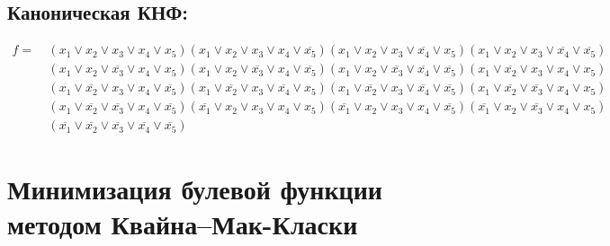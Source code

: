 \documentclass{article}
\begin{document}
\subsection*{Каноническая КНФ:}
\begin{align*}
f =\: &\left(x_{1} \lor x_{2} \lor x_{3} \lor x_{4} \lor x_{5}\right)\left(x_{1} \lor x_{2} \lor x_{3} \lor x_{4} \lor \overline{x_{5}}\right)\left(x_{1} \lor x_{2} \lor x_{3} \lor \overline{x_{4}} \lor x_{5}\right)\left(x_{1} \lor x_{2} \lor x_{3} \lor \overline{x_{4}} \lor \overline{x_{5}}\right)\\&\left(x_{1} \lor x_{2} \lor \overline{x_{3}} \lor x_{4} \lor x_{5}\right)\left(x_{1} \lor x_{2} \lor \overline{x_{3}} \lor x_{4} \lor \overline{x_{5}}\right)\left(x_{1} \lor x_{2} \lor \overline{x_{3}} \lor \overline{x_{4}} \lor \overline{x_{5}}\right)\left(x_{1} \lor \overline{x_{2}} \lor x_{3} \lor x_{4} \lor x_{5}\right)\\&\left(x_{1} \lor \overline{x_{2}} \lor x_{3} \lor x_{4} \lor \overline{x_{5}}\right)\left(x_{1} \lor \overline{x_{2}} \lor x_{3} \lor \overline{x_{4}} \lor x_{5}\right)\left(x_{1} \lor \overline{x_{2}} \lor x_{3} \lor \overline{x_{4}} \lor \overline{x_{5}}\right)\left(x_{1} \lor \overline{x_{2}} \lor \overline{x_{3}} \lor x_{4} \lor x_{5}\right)\\&\left(x_{1} \lor \overline{x_{2}} \lor \overline{x_{3}} \lor x_{4} \lor \overline{x_{5}}\right)\left(\overline{x_{1}} \lor x_{2} \lor x_{3} \lor x_{4} \lor x_{5}\right)\left(\overline{x_{1}} \lor x_{2} \lor x_{3} \lor x_{4} \lor \overline{x_{5}}\right)\left(\overline{x_{1}} \lor x_{2} \lor \overline{x_{3}} \lor x_{4} \lor x_{5}\right)\\&\left(\overline{x_{1}} \lor \overline{x_{2}} \lor \overline{x_{3}} \lor \overline{x_{4}} \lor \overline{x_{5}}\right)\end{align*}
\section*{Минимизация булевой функции методом Квайна--Мак-Класки}
\end{document}
